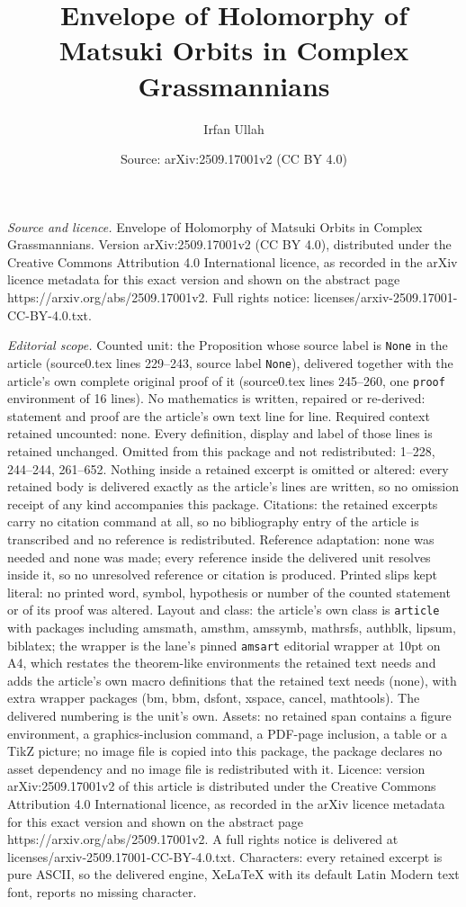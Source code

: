 \documentclass[10pt,a4paper]{amsart}
\title[Envelope of Holomorphy of Matsuki Orbits in Complex Grassman]{Envelope of Holomorphy of Matsuki Orbits in Complex Grassmannians}
\author{Irfan Ullah}
\date{Source: arXiv:2509.17001v2 (CC BY 4.0)}
\begin{document}
\maketitle

\noindent\emph{Source and licence.} Envelope of Holomorphy of Matsuki Orbits in Complex Grassmannians. Version arXiv:2509.17001v2 (CC BY 4.0), distributed under the Creative Commons Attribution 4.0 International licence, as recorded in the arXiv licence metadata for this exact version and shown on the abstract page https://arxiv.org/abs/2509.17001v2. Full rights notice: licenses/arxiv-2509.17001-CC-BY-4.0.txt.\par\smallskip

\noindent\textit{Editorial scope.} Counted unit: the Proposition whose source label is \texttt{None} in the article (source0.tex lines 229--243, source label \texttt{None}), delivered together with the article's own complete original proof of it (source0.tex lines 245--260, one \texttt{proof} environment of 16 lines). No mathematics is written, repaired or re-derived: statement and proof are the article's own text line for line. Required context retained uncounted: none. Every definition, display and label of those lines is retained unchanged. Omitted from this package and not redistributed: 1--228, 244--244, 261--652. Nothing inside a retained excerpt is omitted or altered: every retained body is delivered exactly as the article's lines are written, so no omission receipt of any kind accompanies this package. Citations: the retained excerpts carry no citation command at all, so no bibliography entry of the article is transcribed and no reference is redistributed. Reference adaptation: none was needed and none was made; every reference inside the delivered unit resolves inside it, so no unresolved reference or citation is produced. Printed slips kept literal: no printed word, symbol, hypothesis or number of the counted statement or of its proof was altered. Layout and class: the article's own class is \texttt{article} with packages including amsmath, amsthm, amssymb, mathrsfs, authblk, lipsum, biblatex; the wrapper is the lane's pinned \texttt{amsart} editorial wrapper at 10pt on A4, which restates the theorem-like environments the retained text needs and adds the article's own macro definitions that the retained text needs (none), with extra wrapper packages (bm, bbm, dsfont, xspace, cancel, mathtools). The delivered numbering is the unit's own. Assets: no retained span contains a figure environment, a graphics-inclusion command, a PDF-page inclusion, a table or a TikZ picture; no image file is copied into this package, the package declares no asset dependency and no image file is redistributed with it. Licence: version arXiv:2509.17001v2 of this article is distributed under the Creative Commons Attribution 4.0 International licence, as recorded in the arXiv licence metadata for this exact version and shown on the abstract page https://arxiv.org/abs/2509.17001v2. A full rights notice is delivered at licenses/arxiv-2509.17001-CC-BY-4.0.txt. Characters: every retained excerpt is pure ASCII, so the delivered engine, XeLaTeX with its default Latin Modern text font, reports no missing character.
\end{document}
